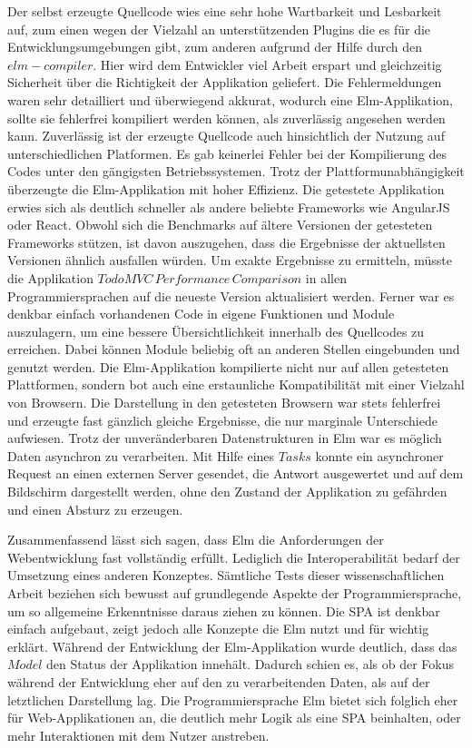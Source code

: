 Der selbst erzeugte Quellcode wies eine sehr hohe Wartbarkeit und Lesbarkeit auf, zum einen wegen der Vielzahl an unterstützenden Plugins die es für die Entwicklungsumgebungen gibt, zum anderen aufgrund der Hilfe durch den $elm-compiler$. Hier wird dem Entwickler viel Arbeit erspart und gleichzeitig Sicherheit über die Richtigkeit der Applikation geliefert. Die Fehlermeldungen waren sehr detailliert und überwiegend akkurat, wodurch eine Elm-Applikation, sollte sie fehlerfrei kompiliert werden können, als zuverlässig angesehen werden kann. Zuverlässig ist der erzeugte Quellcode auch hinsichtlich der Nutzung auf unterschiedlichen Platformen. Es gab keinerlei Fehler bei der Kompilierung des Codes unter den gängigsten Betriebssystemen. Trotz der Plattformunabhängigkeit überzeugte die Elm-Applikation mit hoher Effizienz. Die getestete Applikation erwies sich als deutlich schneller als andere beliebte Frameworks wie AngularJS oder React. Obwohl sich die Benchmarks auf ältere Versionen der getesteten Frameworks stützen, ist davon auszugehen, dass die Ergebnisse der aktuellsten Versionen ähnlich ausfallen würden. Um exakte Ergebnisse zu ermitteln, müsste die Applikation $TodoMVC\,Performance\,Comparison$ in allen Programmiersprachen auf die neueste Version aktualisiert werden.
Ferner war es denkbar einfach vorhandenen Code in eigene Funktionen und Module auszulagern, um eine bessere Übersichtlichkeit innerhalb des Quellcodes zu erreichen. Dabei können Module beliebig oft an anderen Stellen eingebunden und genutzt werden.
Die Elm-Applikation kompilierte nicht nur auf allen getesteten Plattformen, sondern bot auch eine erstaunliche Kompatibilität mit einer Vielzahl von Browsern. Die Darstellung in den getesteten Browsern war stets fehlerfrei und erzeugte fast gänzlich gleiche Ergebnisse, die nur marginale Unterschiede aufwiesen.
Trotz der unveränderbaren Datenstrukturen in Elm war es möglich Daten asynchron zu verarbeiten. Mit Hilfe eines $Tasks$ konnte ein asynchroner Request an einen externen Server gesendet, die Antwort ausgewertet und auf dem Bildschirm dargestellt werden, ohne den Zustand der Applikation zu gefährden und einen Absturz zu erzeugen.

Zusammenfassend lässt sich sagen, dass Elm die Anforderungen der Webentwicklung fast vollständig erfüllt. Lediglich die Interoperabilität bedarf der Umsetzung eines anderen Konzeptes.
Sämtliche Tests dieser wissenschaftlichen Arbeit beziehen sich bewusst auf grundlegende Aspekte der Programmiersprache, um so allgemeine Erkenntnisse daraus ziehen zu können. Die \ac{SPA} ist denkbar einfach aufgebaut, zeigt jedoch alle Konzepte die Elm nutzt und für wichtig erklärt. Während der Entwicklung der Elm-Applikation wurde deutlich, dass das $Model$ den Status der Applikation innehält. Dadurch schien es, als ob der Fokus während der Entwicklung eher auf den zu verarbeitenden Daten, als auf der letztlichen Darstellung lag. Die Programmiersprache Elm bietet sich folglich eher für Web-Applikationen an, die deutlich mehr Logik als eine \ac{SPA} beinhalten, oder mehr Interaktionen mit dem Nutzer anstreben.

